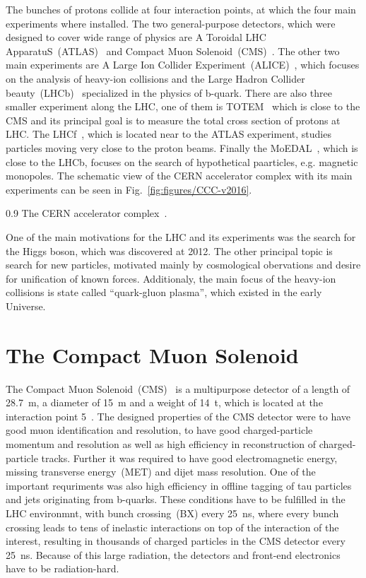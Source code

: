The bunches of protons collide at four interaction points, at which the four main experiments where installed. The two general-purpose detectors, which were designed to cover wide range of physics are A Toroidal  LHC ApparatuS~(ATLAS)~\cite{Aad:2008zzm} and Compact Muon Solenoid~(CMS)~\cite{Chatrchyan:2008aa}. The other two main experiments are A Large Ion Collider Experiment~(ALICE)~\cite{Aamodt:2008zz}, which focuses on the analysis of heavy-ion collisions and the Large Hadron Collider beauty~(LHCb)~\cite{Alves:2008zz} specialized in the physics of b-quark. There are also three smaller experiment along the LHC, one of them is TOTEM~\cite{Anelli:2008zza} which is close to the CMS and its principal goal is to measure the total cross section of protons at LHC. The LHCf~\cite{Adriani:2008zz}, which is located near to the ATLAS experiment, studies particles moving very close to the proton beams. Finally the MoEDAL~\cite{Acharya:2014nyr}, which is close to the LHCb, focuses on the search of hypothetical paarticles, e.g. magnetic monopoles. The schematic view of the CERN accelerator complex with its main experiments can be seen in Fig.~\ref{fig:figures/CCC-v2016}.

                 {0.9}       %
                 { The CERN accelerator complex~\cite{Mobs:2225847}. }

One of the main motivations for the LHC and its experiments was the search for the Higgs boson, which was discovered at 2012. The other principal topic is search for new particles, motivated mainly by cosmological obervations and desire for unification of known forces. Additionaly, the main focus of the  heavy-ion collisions is state called ``quark-gluon plasma'', which existed in the early Universe.

\newpage

\section{The Compact Muon Solenoid~\label{sec:CMS}}

The Compact Muon Solenoid~(CMS)~\cite{Chatrchyan:2008aa, CMSproposal} is a multipurpose detector of a length of 28.7~m, a diameter of 15~m and a weight of 14~t,  which is located at the interaction point 5~\cite{Chatrchyan:2008aa}. The designed properties of the CMS  detector were to have good muon identification and resolution, to have good charged-particle momentum and resolution as well as high efficiency in reconstruction of charged-particle tracks. Further it was required to have good electromagnetic energy, missing transverse energy~(MET) and dijet mass resolution. One of the important requriments was also high efficiency in offline tagging of tau particles and jets originating from b-quarks. These conditions have to be fulfilled in the LHC environmnt, with bunch crossing~(BX) every 25~ns, where every bunch crossing leads to tens of inelastic interactions on top of the interaction of the interest, resulting in thousands of charged particles in the CMS detector every 25~ns. Because of this large radiation, the detectors and front-end electronics have to be radiation-hard.

